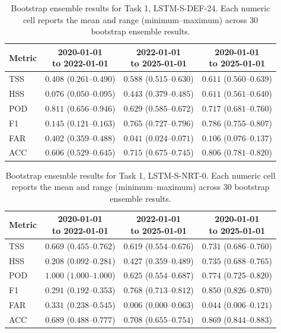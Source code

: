 \begin{table}[htbp]
\centering
\small
\caption{Bootstrap ensemble results for Task 1, LSTM-S-DEF-24. Each numeric cell reports the mean and range (minimum--maximum) across 30 bootstrap ensemble results.}
\label{tab:app-task1-lstm-s-def-24}
\begin{tabular}{lccc}
\toprule
Metric & \shortstack{2020-01-01\\to 2022-01-01} & \shortstack{2022-01-01\\to 2025-01-01} & \shortstack{2020-01-01\\to 2025-01-01} \\
\midrule
TSS & $0.408$ ($0.261$--$0.490$) & $0.588$ ($0.515$--$0.630$) & $0.611$ ($0.560$--$0.639$) \\
HSS & $0.076$ ($0.050$--$0.095$) & $0.443$ ($0.379$--$0.485$) & $0.611$ ($0.561$--$0.640$) \\
POD & $0.811$ ($0.656$--$0.946$) & $0.629$ ($0.585$--$0.672$) & $0.717$ ($0.681$--$0.760$) \\
F1 & $0.145$ ($0.121$--$0.163$) & $0.765$ ($0.727$--$0.796$) & $0.786$ ($0.755$--$0.807$) \\
FAR & $0.402$ ($0.359$--$0.488$) & $0.041$ ($0.024$--$0.071$) & $0.106$ ($0.076$--$0.137$) \\
ACC & $0.606$ ($0.529$--$0.645$) & $0.715$ ($0.675$--$0.745$) & $0.806$ ($0.781$--$0.820$) \\
\bottomrule
\end{tabular}
\end{table}
\clearpage

\begin{table}[htbp]
\centering
\small
\caption{Bootstrap ensemble results for Task 1, LSTM-S-NRT-0. Each numeric cell reports the mean and range (minimum--maximum) across 30 bootstrap ensemble results.}
\label{tab:app-task1-lstm-s-nrt-0}
\begin{tabular}{lccc}
\toprule
Metric & \shortstack{2020-01-01\\to 2022-01-01} & \shortstack{2022-01-01\\to 2025-01-01} & \shortstack{2020-01-01\\to 2025-01-01} \\
\midrule
TSS & $0.669$ ($0.455$--$0.762$) & $0.619$ ($0.554$--$0.676$) & $0.731$ ($0.686$--$0.760$) \\
HSS & $0.208$ ($0.092$--$0.281$) & $0.427$ ($0.359$--$0.489$) & $0.735$ ($0.688$--$0.765$) \\
POD & $1.000$ ($1.000$--$1.000$) & $0.625$ ($0.554$--$0.687$) & $0.774$ ($0.725$--$0.820$) \\
F1 & $0.291$ ($0.192$--$0.353$) & $0.768$ ($0.713$--$0.812$) & $0.850$ ($0.826$--$0.870$) \\
FAR & $0.331$ ($0.238$--$0.545$) & $0.006$ ($0.000$--$0.063$) & $0.044$ ($0.006$--$0.121$) \\
ACC & $0.689$ ($0.488$--$0.777$) & $0.708$ ($0.655$--$0.754$) & $0.869$ ($0.844$--$0.883$) \\
\bottomrule
\end{tabular}
\end{table}
\clearpage

